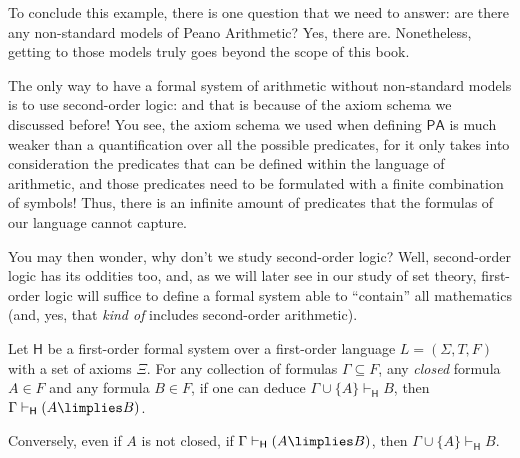 \begin{example}
To conclude this example, there is one question that we need to answer: are there any non-standard models of Peano Arithmetic? Yes, there are.
Nonetheless, getting to those models truly goes beyond the scope of this book.

The only way to have a formal system of arithmetic without non-standard models is to use second-order logic: and that is because of the axiom schema we discussed before!
You see, the axiom schema we used when defining $\mathsf{PA}$ is much weaker than a quantification over all the possible predicates, for it only takes into consideration the predicates that can be defined within the language of arithmetic, and those predicates need to be formulated with a finite combination of symbols!
Thus, there is an infinite amount of predicates that the formulas of our language cannot capture.

You may then wonder, why don't we study second-order logic?
Well, second-order logic has its oddities too, and, as we will later see in our study of set theory, first-order logic will suffice to define a formal system able to ``contain'' all mathematics (and, yes, that \emph{kind of} includes second-order arithmetic).
\end{example}


\begin{theorem}
\label{dedthmfol}
Let $\mathsf{H}$ be a first-order formal system over a first-order language $L = (\Sigma,T,F)$ with a set of axioms $\Xi$.
For any collection of formulas $\Gamma\subseteq F$, any \emph{closed} formula $A\in F$ and any formula $B\in F$, if one can deduce $\Gamma\cup\{A\}\vdash_{\mathsf{H}} B$, then $\Gamma \vdash_\mathsf{H} (A\limplies B)$. 

Conversely, even if $A$ is not closed, if $\Gamma \vdash_\mathsf{H} (A\limplies B)$, then $\Gamma\cup\{A\}\vdash_{\mathsf{H}} B$.
\label{}
\end{theorem}

